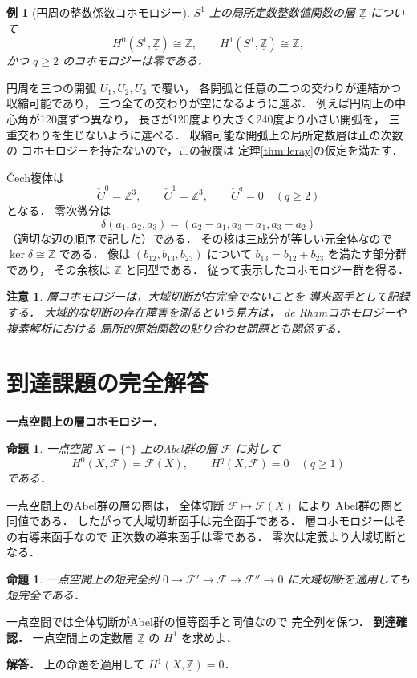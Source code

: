 \documentclass[a5paper,10pt,onecolumn]{jsarticle}
\makeatletter
\theoremstyle{mathnotetheorem}
\newtheorem{proposition}[theorem]{命題}
\newtheorem{example}[theorem]{例}
\newtheorem{remark}[theorem]{注意}
\renewcommand{\proofname}{証明}
\renewenvironment{proof}[1][\proofname]{%
  \par\pushQED{\qed}\normalfont\topsep4\p@\@plus2\p@\relax
  \trivlist\item[\hskip\labelsep\bfseries #1]\ignorespaces
}{\popQED\endtrivlist\@endpefalse}
\makeatother
\begin{document}
\begin{example}[円周の整数係数コホモロジー]
$S^1$ 上の局所定数整数値関数の層
$\underline{\mathbb Z}$ について
\[
 H^0(S^1,\underline{\mathbb Z})\cong\mathbb Z,\qquad
 H^1(S^1,\underline{\mathbb Z})\cong\mathbb Z,
\]
かつ $q\ge2$ のコホモロジーは零である．
\end{example}
\begin{proof}
円周を三つの開弧 $U_1,U_2,U_3$ で覆い，
各開弧と任意の二つの交わりが連結かつ収縮可能であり，
三つ全ての交わりが空になるように選ぶ．
例えば円周上の中心角が120度ずつ異なり，
長さが120度より大きく240度より小さい開弧を，
三重交わりを生じないように選べる．
収縮可能な開弧上の局所定数層は正の次数の
コホモロジーを持たないので，この被覆は
定理\ref{thm:leray}の仮定を満たす．

\v Cech複体は
\[
 \check C^0=\mathbb Z^3,\qquad
 \check C^1=\mathbb Z^3,\qquad
 \check C^q=0\quad(q\ge2)
\]
となる．
零次微分は
\[
 \delta(a_1,a_2,a_3)
 =(a_2-a_1,a_3-a_1,a_3-a_2)
\]
（適切な辺の順序で記した）である．
その核は三成分が等しい元全体なので
$\ker\delta\cong\mathbb Z$ である．
像は
$(b_{12},b_{13},b_{23})$ について
$b_{13}=b_{12}+b_{23}$ を満たす部分群であり，
その余核は $\mathbb Z$ と同型である．
従って表示したコホモロジー群を得る．
\end{proof}

\begin{remark}
層コホモロジーは，大域切断が右完全でないことを
導来函手として記録する．
大域的な切断の存在障害を測るという見方は，
de Rhamコホモロジーや複素解析における
局所的原始関数の貼り合わせ問題とも関係する．
\end{remark}

\section{到達課題の完全解答}
\noindent\textbf{一点空間上の層コホモロジー．}
\begin{proposition}
一点空間 $X=\{*\}$ 上のAbel群の層 $\mathcal F$
に対して
\[
H^0(X,\mathcal F)=\mathcal F(X),\qquad
H^q(X,\mathcal F)=0\quad(q\ge1)
\]
である．
\end{proposition}
\begin{proof}
一点空間上のAbel群の層の圏は，
全体切断 $\mathcal F\mapsto\mathcal F(X)$ により
Abel群の圏と同値である．
したがって大域切断函手は完全函手である．
層コホモロジーはその右導来函手なので
正次数の導来函手は零である．
零次は定義より大域切断となる．
\end{proof}
\begin{proposition}
一点空間上の短完全列
$0\to\mathcal F'\to\mathcal F\to\mathcal F''\to0$
に大域切断を適用しても短完全である．
\end{proposition}
\begin{proof}
一点空間では全体切断がAbel群の恒等函手と同値なので
完全列を保つ．
\end{proof}
\noindent\textbf{到達確認．}
一点空間上の定数層 $\underline{\mathbb Z}$
の $H^1$ を求めよ．
\par\noindent\textbf{解答．}
上の命題を適用して $H^1(X,\underline{\mathbb Z})=0$．
\end{document}

